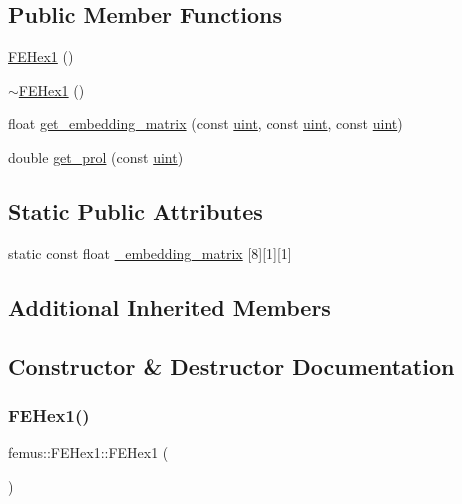 \subsection*{Public Member Functions}
\begin{DoxyCompactItemize}
\item 
\mbox{\hyperlink{classfemus_1_1_f_e_hex1_a3191433251c20a4edf83b4029c9ec4fc}{F\+E\+Hex1}} ()
\item 
\mbox{\hyperlink{classfemus_1_1_f_e_hex1_a63865a413c61c54242946b284e35cd8a}{$\sim$\+F\+E\+Hex1}} ()
\item 
float \mbox{\hyperlink{classfemus_1_1_f_e_hex1_aaa8731caede9d90c2fee78a7440f610a}{get\+\_\+embedding\+\_\+matrix}} (const \mbox{\hyperlink{_typedefs_8hpp_a91ad9478d81a7aaf2593e8d9c3d06a14}{uint}}, const \mbox{\hyperlink{_typedefs_8hpp_a91ad9478d81a7aaf2593e8d9c3d06a14}{uint}}, const \mbox{\hyperlink{_typedefs_8hpp_a91ad9478d81a7aaf2593e8d9c3d06a14}{uint}})
\item 
double \mbox{\hyperlink{classfemus_1_1_f_e_hex1_ac9745cc75964e76795dbca432939df53}{get\+\_\+prol}} (const \mbox{\hyperlink{_typedefs_8hpp_a91ad9478d81a7aaf2593e8d9c3d06a14}{uint}})
\end{DoxyCompactItemize}
\subsection*{Static Public Attributes}
\begin{DoxyCompactItemize}
\item 
static const float \mbox{\hyperlink{classfemus_1_1_f_e_hex1_a8ee2980ed21bc2511602b888ad47c3ae}{\+\_\+embedding\+\_\+matrix}} \mbox{[}8\mbox{]}\mbox{[}1\mbox{]}\mbox{[}1\mbox{]}
\end{DoxyCompactItemize}
\subsection*{Additional Inherited Members}


\subsection{Constructor \& Destructor Documentation}
\mbox{\label{classfemus_1_1_f_e_hex1_a3191433251c20a4edf83b4029c9ec4fc}} 
\subsubsection{\texorpdfstring{F\+E\+Hex1()}{FEHex1()}}
{\footnotesize\ttfamily femus\+::\+F\+E\+Hex1\+::\+F\+E\+Hex1 (\begin{DoxyParamCaption}{ }\end{DoxyParamCaption})}

